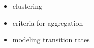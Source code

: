 \begin{itemize}
	\item clustering
	\item criteria for aggregation 
	\item modeling transition rates
\end{itemize}

